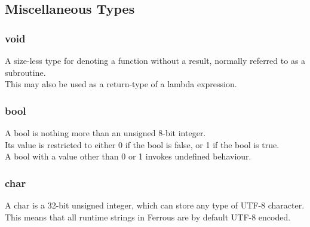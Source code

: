 \color{type_class_misc}
\subsection{Miscellaneous Types} \label{subsec:miscellaneous-types}
\color{secondary_fg}

\subsubsection{void} \label{subsubsec:void}
A size-less type for denoting a function without a result, normally referred
to as a subroutine.\\
This may also be used as a return-type of a lambda expression.

\subsubsection{bool} \label{subsubsec:bool}
A bool is nothing more than an unsigned 8-bit integer.\\
Its value is restricted to either 0 if the bool is false, or 1 if the bool is true.\\
A bool with a value other than 0 or 1 invokes undefined behaviour.

\subsubsection{char} \label{subsubsec:char}
A char is a 32-bit unsigned integer, which can store any type of UTF-8 character.\\
This means that all runtime strings in Ferrous are by default UTF-8 encoded.
